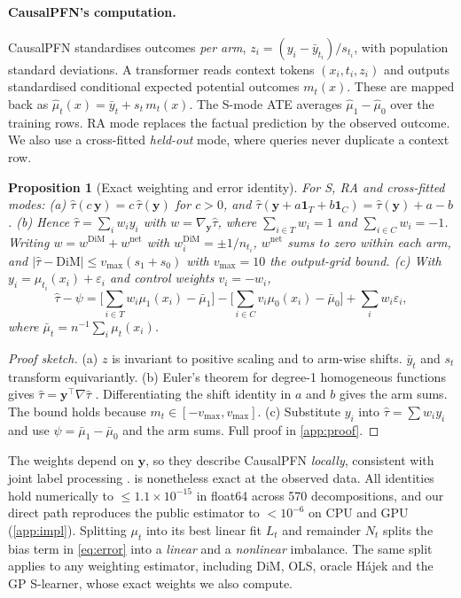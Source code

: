 \documentclass{article}
\newtheorem{proposition}{Proposition}
\newcommand{\DiM}{\mathrm{DiM}}
\newcommand{\that}{\hat\tau}
\begin{document}
\paragraph{CausalPFN's computation.}
CausalPFN standardises outcomes \emph{per arm}, $z_i = (y_i - \bar y_{t_i})/s_{t_i}$, with population standard deviations. A transformer reads context tokens $(x_i, t_i, z_i)$ and outputs standardised conditional expected potential outcomes $m_t(x)$. These are mapped back as $\hat\mu_t(x) = \bar y_t + s_t\,m_t(x)$. The S-mode ATE averages $\hat\mu_1-\hat\mu_0$ over the training rows. RA mode replaces the factual prediction by the observed outcome. We also use a cross-fitted \emph{held-out} mode, where queries never duplicate a context row.

\begin{proposition}[Exact weighting and error identity]\label{prop:weights}
For S, RA and cross-fitted modes:
(a) $\that(c\,\mathbf y) = c\,\that(\mathbf y)$ for $c>0$, and $\that(\mathbf y + a\mathbf 1_{T} + b\mathbf 1_{C}) = \that(\mathbf y) + a - b$.
(b) Hence $\that = \sum_i w_i y_i$ with $w = \nabla_{\mathbf y}\that$, where $\sum_{i\in T} w_i = 1$ and $\sum_{i\in C} w_i = -1$. Writing $w = w^{\DiM} + w^{\mathrm{net}}$ with $w^{\DiM}_i = \pm 1/n_{t_i}$, $w^{\mathrm{net}}$ sums to zero within each arm, and $|\that - \DiM| \le v_{\max}(s_1+s_0)$ with $v_{\max}=10$ the output-grid bound.
(c) With $y_i = \mu_{t_i}(x_i) + \varepsilon_i$ and control weights $v_i = -w_i$,
\begin{equation}\label{eq:error}
\that - \psi = \Big[\textstyle\sum_{i\in T} w_i\mu_1(x_i) - \bar\mu_1\Big] - \Big[\sum_{i\in C} v_i\mu_0(x_i) - \bar\mu_0\Big] + \sum_i w_i\varepsilon_i ,
\end{equation}
where $\bar\mu_t = n^{-1}\sum_i \mu_t(x_i)$.
\end{proposition}
\begin{proof}[Proof sketch]
(a) $z$ is invariant to positive scaling and to arm-wise shifts. $\bar y_t$ and $s_t$ transform equivariantly. (b) Euler's theorem for degree-1 homogeneous functions gives $\that = \mathbf y^\top\nabla\that$ \citep[cf.][]{hesse2021fast}. Differentiating the shift identity in $a$ and $b$ gives the arm sums. The bound holds because $m_t \in [-v_{\max}, v_{\max}]$. (c) Substitute $y_i$ into $\that=\sum w_i y_i$ and use $\psi = \bar\mu_1-\bar\mu_0$ and the arm sums. Full proof in \cref{app:proof}.
\end{proof}
The weights depend on $\mathbf y$, so they describe CausalPFN \emph{locally}, consistent with joint label processing \citep{nguyen2026standardization}.  is nonetheless exact at the observed data. All identities hold numerically to $\le 1.1\times10^{-15}$ in float64 across 570 decompositions, and our direct path reproduces the public estimator to $<10^{-6}$ on CPU and GPU (\cref{app:impl}). Splitting $\mu_t$ into its best linear fit $L_t$ and remainder $N_t$ splits the bias term in \cref{eq:error} into a \emph{linear} and a \emph{nonlinear} imbalance. The same split applies to any weighting estimator, including DiM, OLS, oracle Hájek and the GP S-learner, whose exact weights we also compute.
\end{document}
